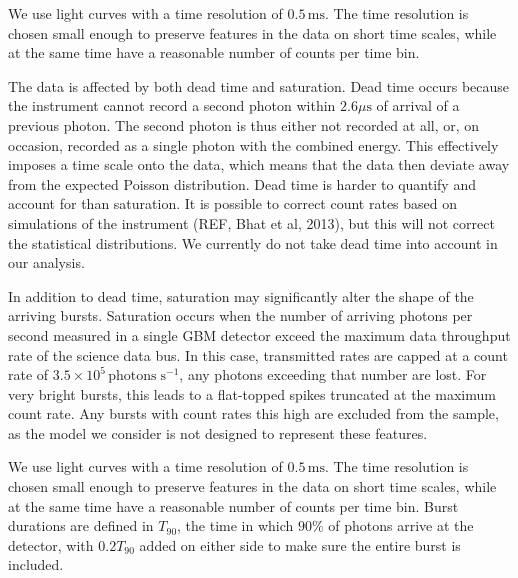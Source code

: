 \documentclass[12pt]{emulateapj}
\newcommand{\counts}{y}
\begin{document}
We use light curves with a time resolution of $0.5\,\mathrm{ms}$. The time resolution is chosen small enough to preserve features
in the data on short time scales, while at the same time have a reasonable number of counts per time bin. 

The data is affected by both dead time and saturation. 
Dead time occurs because the instrument cannot record a second photon within $2.6\mu\mathrm{s}$ of arrival of a previous photon. 
The second photon is thus either not recorded at all, or, on occasion, recorded as a single photon with the combined energy. This effectively 
imposes a time scale onto the data, which means that the data then deviate away from the expected Poisson distribution. 
Dead time is harder to quantify and account for than saturation. It is possible to correct count rates based on simulations of the instrument (REF, Bhat et al, 2013),
but this will not correct the statistical distributions. We currently do not take dead time into account in our analysis. 

In addition to dead time, saturation may significantly alter the shape of the arriving bursts. Saturation occurs when the number of arriving photons per second
measured in a single GBM detector exceed the maximum data throughput rate of the science data bus. In this case, transmitted rates are capped at a 
count rate of $3.5 \times 10^{5} \, \mathrm{photons} \; \mathrm{s}^{-1}$, any photons exceeding that number are lost. For very bright bursts, this leads
to a flat-topped spikes truncated at the maximum count rate. Any bursts with count rates this high are excluded from the sample, as the model we
consider is not designed to represent these features. 

We use light curves with a time resolution of $0.5\,\mathrm{ms}$. The time resolution is chosen small enough to preserve features
in the data on short time scales, while at the same time have a reasonable number of counts per time bin. 
Burst durations are defined in $T_{90}$, the time in which $90\%$ of photons arrive at the detector, with $0.2T_{90}$ added on either side
to make sure the entire burst is included. 


\end{document}
